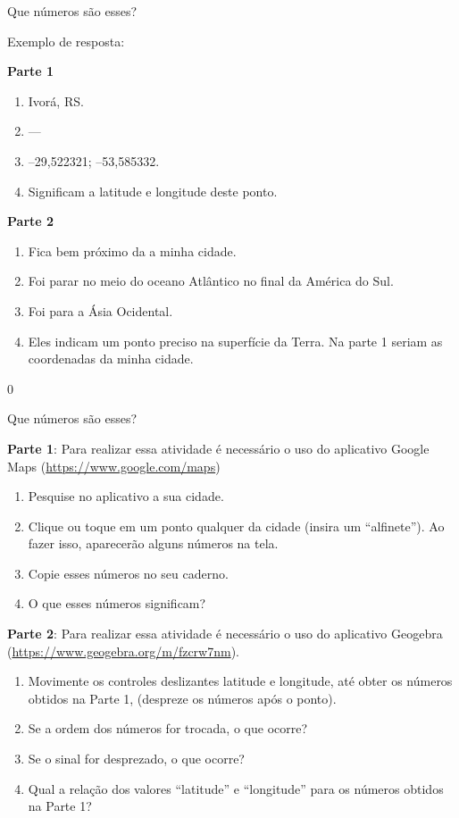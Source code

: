 \begin{resposta}{Que números são esses?}
{Exemplo de resposta:

  \textbf{Parte 1}
  \begin{enumerate}
  \item Ivorá, RS.
  \item ---
  \item --29{,}522321; --53,585332.
  \item Significam a latitude e longitude deste ponto.
  \end{enumerate}
\vspace{\baselineskip}
  \textbf{Parte 2}
  \begin{enumerate}
  \item Fica bem próximo da a minha cidade.
  \item Foi parar no meio do oceano Atlântico no final da América do Sul.
  \item Foi para a Ásia Ocidental.
  \item Eles indicam um ponto preciso na superfície da Terra. Na parte 1 seriam as coordenadas da minha cidade.
  \end{enumerate}
}{0}
\end{resposta}

\label{coord_geo}



\begin{task}{Que números são esses?}

\textbf{Parte 1}: Para realizar essa atividade é necessário o uso do aplicativo Google Maps (\url{https://www.google.com/maps})
\begin{enumerate}
\item Pesquise no aplicativo a sua cidade.
\item Clique ou toque em um ponto qualquer da cidade (insira um “alfinete”). Ao fazer isso, aparecerão alguns números na tela.
\item Copie esses números no seu caderno.
\item O que esses números significam?
\end{enumerate}

\textbf{Parte 2}: Para realizar essa atividade é necessário o uso do aplicativo Geogebra (\url{https://www.geogebra.org/m/fzcrw7nm}).
\begin{enumerate}
\item Movimente os controles deslizantes latitude e longitude, até obter os números obtidos na Parte 1, (despreze os números após o ponto).
\item Se a ordem dos números for trocada, o que ocorre?
\item Se o sinal for desprezado, o que ocorre?
\item Qual a relação dos valores “latitude” e “longitude” para os números obtidos na Parte 1?
\end{enumerate}

\end{task}


